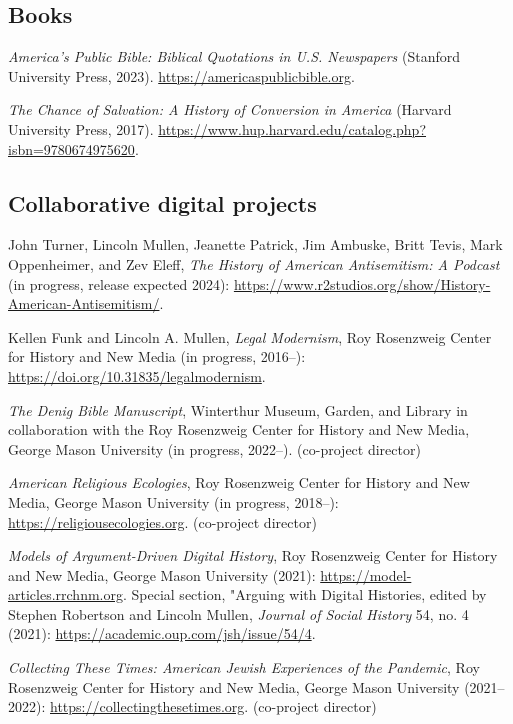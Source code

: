 \documentclass[11pt]{article}
\begin{document}

\subsection{Books}\label{Books}

\emph{America's Public Bible: Biblical Quotations in U.S. Newspapers} (Stanford University Press, 2023). \url{https://americaspublicbible.org}.

\emph{The Chance of Salvation: A History of Conversion in America} (Harvard University Press, 2017). \url{https://www.hup.harvard.edu/catalog.php?isbn=9780674975620}.

\subsection{Collaborative digital projects}\label{Digital projects}

John Turner, Lincoln Mullen, Jeanette Patrick, Jim Ambuske, Britt Tevis, Mark Oppenheimer, and Zev Eleff, \emph{The History of American Antisemitism: A Podcast} (in progress, release expected 2024): \url{https://www.r2studios.org/show/History-American-Antisemitism/}.

Kellen Funk and Lincoln A. Mullen, \emph{Legal Modernism}, Roy Rosenzweig Center for History and New Media (in progress, 2016--): \url{https://doi.org/10.31835/legalmodernism}.

\emph{The Denig Bible Manuscript}, Winterthur Museum, Garden, and Library in collaboration with the Roy Rosenzweig Center for History and New Media, George Mason University (in progress, 2022--). (co-project director)

\emph{American Religious Ecologies}, Roy Rosenzweig Center for History and New Media, George Mason University (in progress, 2018--): \url{https://religiousecologies.org}. (co-project director)

\emph{Models of Argument-Driven Digital History}, Roy Rosenzweig Center for History and New Media, George Mason University (2021): \url{https://model-articles.rrchnm.org}. Special section, "Arguing with Digital Histories, edited by Stephen Robertson and Lincoln Mullen, \emph{Journal of Social History} 54, no. 4 (2021): \url{https://academic.oup.com/jsh/issue/54/4}. 

\emph{Collecting These Times: American Jewish Experiences of the Pandemic}, Roy Rosenzweig Center for History and New Media, George Mason University (2021--2022): \url{https://collectingthesetimes.org}. (co-project director)
\end{document}

